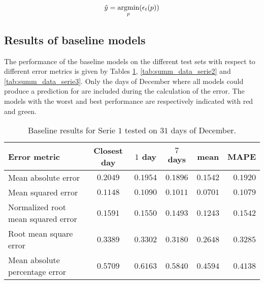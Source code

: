 \begin{equation}\label{eq:model_mape_solve} 	
	\hat{y} = \operatorname*{argmin}_{p}(\epsilon_{t}(p))
\end{equation}
 
 
\subsection{Results of baseline models}
The performance of the baseline models on the different test sets with respect to different error metrics is given by Tables \ref{tab:summ_data_serie1}, \ref{tab:summ_data_serie2} and \ref{tab:summ_data_serie3}. Only the days of December where all models could produce a prediction for are included during the calculation of the error. The models with the worst and best performance are respectively indicated with red and green.  

\begin{table}[ht]
	\centering
	\begin{tabular}{@{}l|ccccr@{}} \toprule
		\textbf{Error metric}	& \textbf{Closest day} & \textbf{$ 1 $ day} & \textbf{$ 7 $ days} & \textbf{mean} & \textbf{MAPE}\\\midrule
		Mean absolute error& \cellcolor{red!25}$0.2049 $&$ 0.1954 $  & $0.1896 $ & \cellcolor{green!25}$ 0.1542 $ & $ 0.1920 $\\
		Mean squared error& \cellcolor{red!25}$0.1148 $&$ 0.1090 $  & $0.1011 $ & \cellcolor{green!25}$ 0.0701 $ & $ 0.1079 $\\
		Normalized root mean squared error& \cellcolor{red!25}$0.1591 $&$ 0.1550$  & $0.1493$ & \cellcolor{green!25}$ 0.1243$ & $ 0.1542$\\
		Root mean square error&\cellcolor{red!25} $0.3389 $&$ 0.3302$  & $0.3180$ & \cellcolor{green!25}$ 0.2648$ & $ 0.3285$\\
		Mean absolute percentage error & $ 0.5709 $&\cellcolor{red!25}$ 0.6163 $  & $ 0.5840 $ & $ 0.4594 $ & \cellcolor{green!25}$ 0.4138 $\\\bottomrule
	\end{tabular}
	\caption{Baseline results for Serie $ 1 $ tested on $ 31 $ days of December.}
	\label{tab:summ_data_serie1}
\end{table}


